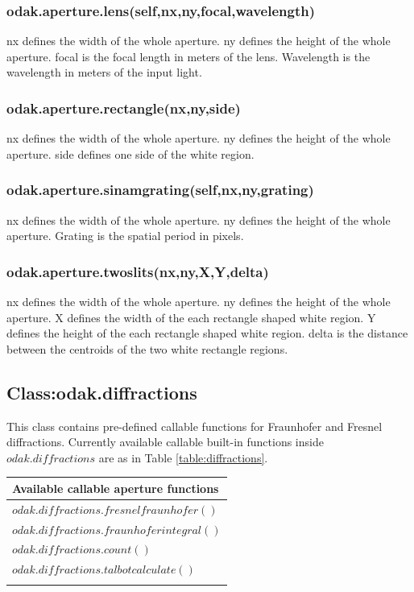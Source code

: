 \documentclass[journal,9pt]{IEEEtran}
\begin{document}
\subsubsection{odak.aperture.lens(self,nx,ny,focal,wavelength)}
nx defines the width of the whole aperture. ny defines the height of the whole aperture. focal is the focal length in meters of the lens. Wavelength is the wavelength in meters of the input light.\\
\subsubsection{odak.aperture.rectangle(nx,ny,side)}
nx defines the width of the whole aperture. ny defines the height of the whole aperture. side defines one side of the white region.\\
\subsubsection{odak.aperture.sinamgrating(self,nx,ny,grating)}
nx defines the width of the whole aperture. ny defines the height of the whole aperture. Grating is the spatial period in pixels.\\
\subsubsection{odak.aperture.twoslits(nx,ny,X,Y,delta)}
nx defines the width of the whole aperture. ny defines the height of the whole aperture.  X defines the width of the each rectangle shaped white region. Y defines the height of the each rectangle shaped white region. delta is the distance between the centroids of the two white rectangle regions.\\

\subsection{Class:odak.diffractions}
This class contains pre-defined callable functions for Fraunhofer and Fresnel diffractions. Currently available callable built-in functions inside $odak.diffractions$ are as in Table \ref{table:diffractions}.

\begin{tabular}{ l }
  \\Available callable aperture functions\\ \hline
  $odak.diffractions.fresnelfraunhofer()$\\
  $odak.diffractions.fraunhoferintegral()$\\
  $odak.diffractions.count()$\\
  $odak.diffractions.talbotcalculate()$\\
\label{table:diffractions}
\end{tabular}
\end{document}
